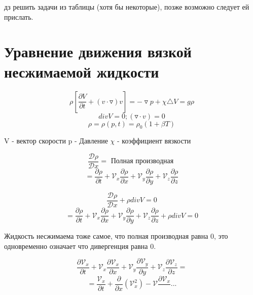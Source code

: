 \documentclass[14pt]{extarticle}
\begin{document}
дз решить задачи из таблицы (хотя бы некоторые), позже возможно следует ей прислать.

\section{Уравнение движения вязкой несжимаемой жидкости}

\[ \rho [\frac{\partial V }{\partial t } + (v \cdot \triangledown)v] = - \triangledown p + \chi \triangle V = g \rho \]
\[ div V = 0;  (\triangledown \cdot v) = 0\]
\[ \rho = \rho(p, t) = \rho_0 (1 + \beta T) \]

V - вектор скорости
p - Давление
$ \chi $ - коэффициент вязкости

\[  \frac{\mathcal{D} \rho}{\mathcal{D} x} =  \textrm{ Полная производная }\]
\[ = \frac{\partial \rho}{\partial t} + \mathcal{V}_x \frac{\partial \rho}{\partial x} + \mathcal{V}_y \frac{\partial \rho}{\partial y} + \mathcal{V}_z \frac{\partial \rho}{\partial z} \]

\[  \frac{\mathcal{D} \rho}{\mathcal{D} x} + \rho div V = 0 \]
\[ = \frac{\partial \rho}{\partial t} + \mathcal{V}_x \frac{\partial \rho}{\partial x} + \mathcal{V}_y \frac{\partial \rho}{\partial y} + \mathcal{V}_z \frac{\partial \rho}{\partial z} + \rho div V = 0\]

Жидкость несжимаема тоже самое, что полная производная равна 0, это одновременно означает что дивергенция равна 0. 

\[ \frac{\partial \mathcal{V}_x}{\partial t} + \mathcal{V}_x \frac{\partial \mathcal{V}_x}{\partial x}+ \mathcal{V}_y \frac{\partial \mathcal{V}_y}{\partial y}+ \mathcal{V}_z \frac{\partial \mathcal{V}_z}{\partial z} = \]
\[ = \frac{\mathcal{V}_x}{\partial t} + \frac{\partial}{\partial x} (\mathcal{V}^2_x) - \mathcal{V}\frac{\partial\mathcal{V}_x}{} ... \]
\end{document}
